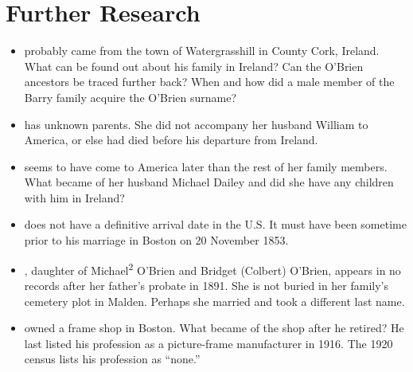 \chapter{Further Research}

\begin{itemize}

	\item{} probably came from the town of Watergrasshill in County Cork, Ireland. What can be found out about his family in Ireland? Can the O'Brien ancestors be traced further back? When and how did a male member of the Barry family acquire the O'Brien surname?

	\item{} has unknown parents. She did not accompany her husband William to America, or else had died before his departure from Ireland. 

	\item{} seems to have come to America later than the rest of her family members. What became of her husband Michael Dailey and did she have any children with him in Ireland?

	\item{} does not have a definitive arrival date in the U.S. It must have been sometime prior to his marriage in Boston on 20 November 1853.

	\item{}, daughter of Michael\textsuperscript{2} O'Brien and Bridget (Colbert) O'Brien, appears in no records after her father's probate in 1891. She is not buried in her family's cemetery plot in Malden. Perhaps she married and took a different last name.

	\item{} owned a frame shop in Boston. What became of the shop after he retired? He last listed his profession as a picture-frame manufacturer in 1916. The 1920 census lists his profession as ``none.''\cite{John3OBrien1916:4}

\end{itemize}